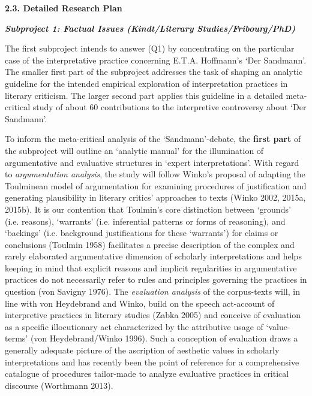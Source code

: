 \noindent\textbf{\large 2.3. Detailed Research Plan}




\vspace{.2cm}
\noindent\textbf{\emph{Subproject 1: Factual Issues (Kindt/Literary Studies/Fribourg/PhD)}}
\vspace{.1cm}

\noindent The first subproject intends to answer (Q1) by concentrating on the particular case of the interpretative practice concerning E.T.A. Hoffmann's `Der Sandmann'. The smaller first part of the subproject addresses the task of shaping an analytic guideline for the intended empirical exploration of interpretation practices in literary criticism. The larger second part applies this guideline in a detailed meta-critical study of about 60 contributions to the interpretive controversy about `Der Sandmann'. 


To inform  the meta-critical analysis of the `Sandmann'-debate, the \textbf{first part} of the subproject will outline an `analytic manual' for the illumination of argumentative and evaluative structures in `expert interpretations'. With regard to \emph{argumentation analysis}, the study will follow Winko's proposal of adapting the Toulminean model of argumentation for examining procedures of justification and generating plausibility in literary critics' approaches to texts (Winko 2002, 2015a, 2015b). It is our contention that Toulmin's core distinction between `grounds' (i.e. reasons), `warrants' (i.e. inferential patterns or forms of reasoning), and `backings' (i.e. background justifications for these `warrants') for claims or conclusions (Toulmin 1958) facilitates a precise description of the complex and rarely elaborated argumentative dimension of scholarly interpretations and helps keeping in mind that explicit reasons and implicit regularities in argumentative practices do not necessarily refer to rules and principles governing the practices in question (von Savigny 1976). The \emph{evaluation analysis} of the corpus-texts will, in line with von Heydebrand and Winko, build on the speech act-account of interpretive practices in literary studies (Zabka 2005) and conceive of evaluation as a specific illocutionary act characterized by the attributive usage of `value-terms' (von Heydebrand/Winko 1996). Such a conception of evaluation draws a generally adequate picture of the ascription of aesthetic values in scholarly interpretations and has recently been the point of reference for a comprehensive catalogue of procedures tailor-made to analyze evaluative practices in critical discourse (Worthmann 2013).

